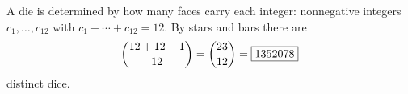 A die is determined by how many faces carry each integer: nonnegative integers $c_1,\dots,c_{12}$ with $c_1+\cdots+c_{12}=12$. By stars and bars there are
\[
\dbinom{12+12-1}{12}=\dbinom{23}{12}=\boxed{1352078}
\]
distinct dice.
